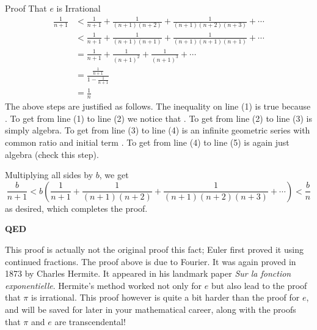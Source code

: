 \begin{exercise}{Proof That $e$ is Irrational \Coffeecup \Coffeecup \Coffeecup}
\begin{align}
\frac{1}{n+1} &< \frac{1}{n+1}+ \frac{1}{(n+1)(n+2)}+\frac{1}{(n+1)(n+2)(n+3)}+\cdots \\
 &< \frac{1}{n+1}+ \frac{1}{(n+1)(n+1)}+\frac{1}{(n+1)(n+1)(n+1)}+\cdots \\
 &= \frac{1}{n+1}+ \frac{1}{(n+1)^2}+\frac{1}{(n+1)^3}+\cdots \\
 &= \frac{\frac{1}{n+1}}{1-\frac{1}{n+1}} \\
 &= \frac{1}{n}
\end{align} The above steps are justified as follows.  The inequality on line (1) is true because \underline{\hspace{2in}}.  To get from line (1) to line (2) we notice that \underline{\hspace{3in}}.  To get from line (2) to line (3) is simply algebra.  To get from line (3) to line (4) is an infinite geometric series with common ratio \underline{\hspace{1in}} and initial term \underline{\hspace{1in}}.  To get from line (4) to line (5) is again just algebra (check this step).

Multiplying all sides by $b$, we get $$ \frac{b}{n+1} < b \left( \frac{1}{n+1}+ \frac{1}{(n+1)(n+2)}+\frac{1}{(n+1)(n+2)(n+3)}+\cdots\right) < \frac{b}{n} $$ as desired, which completes the proof. 

\hspace{4in} {\bf QED}
\end{exercise}
\vspace{.2in}

This proof is actually not the original proof this fact; Euler first proved it using continued fractions.  The proof above is due to Fourier.  It was again proved in 1873 by Charles Hermite.  It appeared in his landmark paper \emph{ Sur la fonction exponentielle}.  Hermite's method worked not only for $e$ but also lead to the proof that $\pi$ is irrational.  This proof however is quite a bit harder than the proof for $e$, and will be saved for later in your mathematical career, along with the proofs that $\pi$ and $e$ are transcendental!